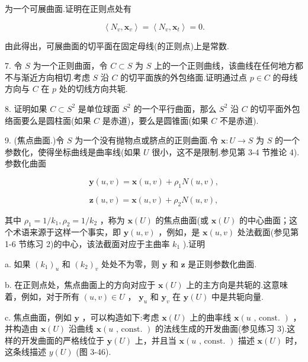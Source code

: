 为一个可展曲面.证明在正则点处有

\[
\left\langle  {{N}_{v},{\mathbf{x}}_{v}}\right\rangle   = \left\langle  {{N}_{v},{\mathbf{x}}_{t}}\right\rangle   = 0.
\]

由此得出，可展曲面的切平面在固定母线(的正则点)上是常数.

7. 令 \(S\) 为一个正则曲面，令 \(C \subset  S\) 为 \(S\) 上的一个正则曲线，该曲线在任何地方都不与渐近方向相切.考虑 \(S\) 沿 \(C\) 的切平面族的外包络面.证明通过点 \(p \in  C\) 的母线方向与 \(C\) 在 \(p\) 处的切线方向共轭.

8. 证明如果 \(C \subset  {S}^{2}\) 是单位球面 \({S}^{2}\) 的一个平行曲面，那么 \({S}^{2}\) 沿 \(C\) 的切平面外包络面要么是圆柱面(如果 \(C\) 是赤道)，要么是圆锥面(如果 \(C\) 不是赤道).

9. (焦点曲面.)令 \(S\) 为一个没有抛物点或脐点的正则曲面.令 \(\mathbf{x} : U \rightarrow  S\) 为 \(S\) 的一个参数化，使得坐标曲线是曲率线(如果 \(U\) 很小，这不是限制.参见第 3-4 节推论 4).参数化曲面

\[
\mathbf{y}\left( {u,v}\right)  = \mathbf{x}\left( {u,v}\right)  + {\rho }_{1}N\left( {u,v}\right) ,
\]

\[
\mathbf{z}\left( {u,v}\right)  = \mathbf{x}\left( {u,v}\right)  + {\rho }_{2}N\left( {u,v}\right) ,
\]

其中 \({\rho }_{1} = 1/{k}_{1},{\rho }_{2} = 1/{k}_{2}\) ，称为 \(\mathbf{x}\left( U\right)\) 的焦点曲面(或 \(\mathbf{x}\left( U\right)\) 的中心曲面；这个术语来源于这样一个事实，即 \(\mathbf{y}\left( {u,v}\right)\) ，例如，是 \(\mathbf{x}\left( {u,v}\right)\) 处法截面(参见第 1-6 节练习 2)的中心，该法截面对应于主曲率 \({k}_{1}\) ).证明

a. 如果 \({\left( {k}_{1}\right) }_{u}\) 和 \({\left( {k}_{2}\right) }_{v}\) 处处不为零，则 \(\mathbf{y}\) 和 \(\mathbf{z}\) 是正则参数化曲面.

b. 在正则点处，焦点曲面上的方向对应于 \(\mathbf{x}\left( U\right)\) 上的主方向是共轭的.这意味着，例如，对于所有 \(\left( {u,v}\right)  \in  U\) ， \({\mathbf{y}}_{u}\) 和 \({\mathbf{y}}_{v}\) 在 \(\mathbf{y}\left( U\right)\) 中是共轭向量.

c. 焦点曲面，例如 \(\mathbf{y}\) ，可以构造如下:考虑 \(\mathbf{x}\left( U\right)\) 上的曲率线 \(\mathbf{x}\left( {u\text{ , const. }}\right)\) ，并构造由 \(\mathbf{x}\left( U\right)\) 沿曲线 \(\mathbf{x}\left( {u\text{ , const. }}\right)\) 的法线生成的开发曲面(参见练习 3).这样的开发曲面的严格线位于 \(\mathbf{y}\left( U\right)\) 上，并且当 \(\mathbf{x}\left( {u\text{ , const. }}\right)\) 描述 \(\mathbf{x}\left( U\right)\) 时，这条线描述 \(y\left( U\right)\) (图 3-46).

